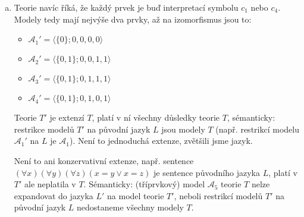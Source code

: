 \begin{problem}
\begin{solution}
\begin{enumerate}[(a)]
            \item Teorie navíc říká, že každý prvek je buď interpretací symbolu $c_1$ nebo $c_4$. Modely tedy mají nejvýše dva prvky, až na izomorfismus jsou to:
            \begin{itemize}
                \item $\mathcal A_1'=\langle\{0\};0,0,0,0\rangle$
                \item $\mathcal A_2'=\langle\{0,1\};0,0,1,1\rangle$
                \item $\mathcal A_3'=\langle\{0,1\};0,1,1,1\rangle$
                \item $\mathcal A_4'=\langle\{0,1\};0,1,0,1\rangle$                
            \end{itemize}
            Teorie $T'$ je extenzí $T$, platí v ní všechny důsledky teorie $T$, sémanticky: restrikce modelů $T'$ na původní jazyk $L$ jsou modely $T$ (např. restrikcí modelu $\mathcal A_1'$ na $L$ je $\mathcal A_1$). Není to jednoduchá extenze, zvětšili jsme jazyk. 
            
            Není to ani konzervativní extenze, např. sentence $(\forall x)(\forall y)(\forall z)(x=y\lor x=z)$ je sentence původního jazyka $L$, platí v $T'$ ale neplatila v $T$. Sémanticky: (tříprvkový) model $\mathcal A_5$ teorie $T$ nelze expandovat do jazyka $L'$ na model teorie $T'$, neboli restrikcí modelů $T'$ na původní jazyk $L$ nedostaneme všechny modely $T$.

        \end{enumerate}
                    
    \end{solution}

\end{problem}


